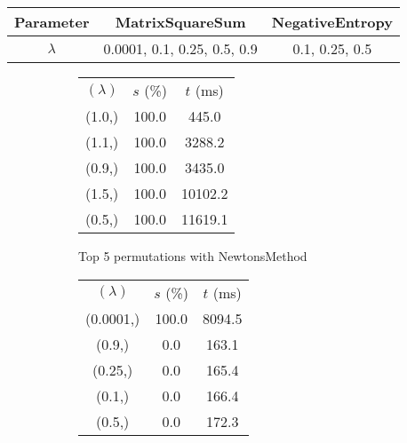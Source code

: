 \begin{center}
\label{tab:params_ConstantSearch}
\begin{tabular}{|c|c|c|}
\hline
\rowcolor{gray!25}
Parameter & MatrixSquareSum & NegativeEntropy \\
\hline
$\lambda$ & 0.0001, 0.1, 0.25, 0.5, 0.9 & 0.1, 0.25, 0.5 \\
\hline
\end{tabular}
\end{center}

\begin{figure}[H]
\label{fig:param_comp_MatrixSquareSum_ConstantSearch}
\begin{subfigure}[ht]{.5\textwidth}
\begin{tabular}{|c|c|c|}
\hline
\rowcolor{gray!25}
\multicolumn{3}{|c|}{NewtonsMethod} \\
\hline
\rowcolor{gray!25}
$(\lambda)$ & $s$ (\%) & $t$ (ms) \\
\hline
(1.0,) & 100.0 & 445.0 \\
(1.1,) & 100.0 & 3288.2 \\
(0.9,) & 100.0 & 3435.0 \\
(1.5,) & 100.0 & 10102.2 \\
(0.5,) & 100.0 & 11619.1 \\
\hline
\end{tabular}
\caption{Top 5 permutations with NewtonsMethod}
\label{subfig:param_comp_MatrixSquareSum_NewtonsMethod_ConstantSearch}
\end{subfigure}
\hfill
\begin{subfigure}[ht]{.5\textwidth}
\begin{tabular}{|c|c|c|}
\hline
\rowcolor{gray!25}
\multicolumn{3}{|c|}{GradientDescentMethod} \\
\hline
\rowcolor{gray!25}
$(\lambda)$ & $s$ (\%) & $t$ (ms) \\
\hline
(0.0001,) & 100.0 & 8094.5 \\
(0.9,) & 0.0 & 163.1 \\
(0.25,) & 0.0 & 165.4 \\
(0.1,) & 0.0 & 166.4 \\
(0.5,) & 0.0 & 172.3 \\
\hline
\end{tabular}

\end{subfigure}
\end{figure}
